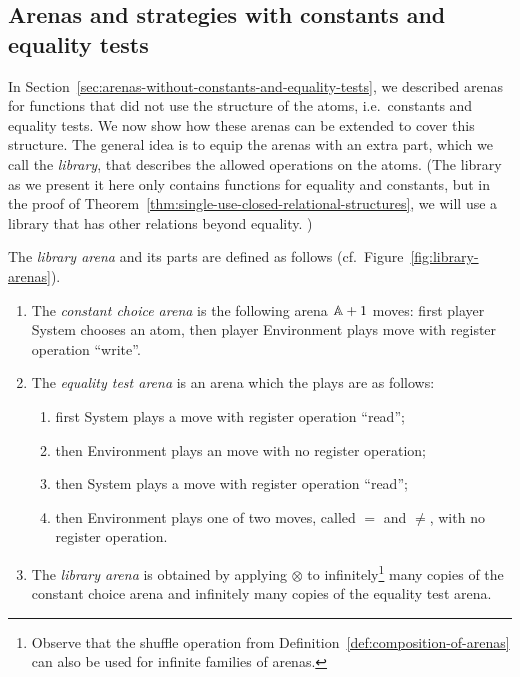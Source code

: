 \documentclass[a4paper,UKenglish,cleveref, autoref, numberwithinsect, thm-restate]{lipics-v2021}
\begin{document}
\subsection{Arenas and strategies with constants and equality tests}
\label{sec:arenas-with-constants-and-equality-tests}
In Section~\ref{sec:arenas-without-constants-and-equality-tests}, we described arenas for functions that did not use the structure of the atoms, i.e.~constants and equality tests. We now show how these arenas can be extended to cover this structure. The general idea is to equip the arenas with an extra part, which we call the \emph{library},  that describes the allowed operations on the atoms. (The library as we present it here only contains functions for equality and constants, but in the proof of Theorem~\ref{thm:single-use-closed-relational-structures}, we will use a library that has other relations beyond equality. )



\begin{definition}\label{def:library-arena} The \emph{library arena} and its parts are defined as follows (cf.~Figure~\ref{fig:library-arenas}).
    \begin{enumerate}
        \item The \emph{constant choice arena} is the following arena $\mathbb A+1$ moves:
        first player System chooses an atom, then player Environment plays move with register operation ``write''. 
        \item The \emph{equality test arena} is an arena which the plays are as follows:
    \begin{enumerate}
        \item first System plays a move with register operation ``read'';
        \item then Environment plays an move with no register operation;
        \item then System plays a move with register operation ``read'';
        \item then Environment plays one of two moves, called $=$ and $\neq$, with no register operation.
    \end{enumerate}
    \item The \emph{library arena} is obtained by applying $\otimes$ to infinitely\footnote{
        Observe that the shuffle operation from Definition~\ref{def:composition-of-arenas} can also be used for infinite families of arenas.
    } many copies of the constant choice arena and infinitely many copies of the  equality test arena. 
    \end{enumerate}
\end{definition}
\end{document}
